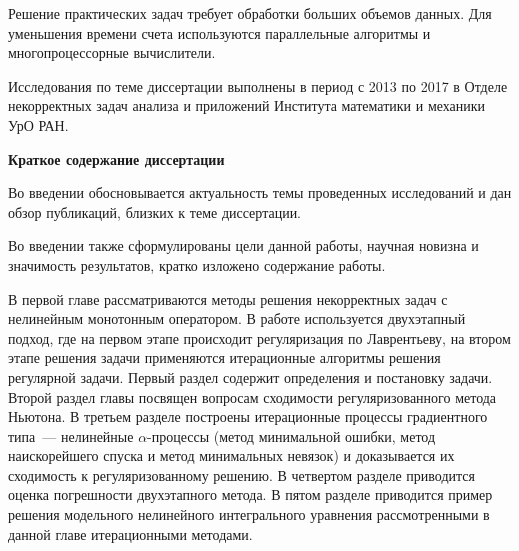 \intro

%
%

\actualitysection
\actualitytext

Решение практических задач требует обработки больших объемов данных. Для уменьшения времени счета используются параллельные алгоритмы и многопроцессорные вычислители.


\developmentsection
\developmenttext

\objectivesection
\objectivetext

\methodssection
\methodstext

\noveltysection
\noveltytext

{}


\approbationsection
\approbationtext

\pubsection
\pubtext

\contribsection
\contribtext

\structsection
\structtext


Исследования по теме диссертации выполнены в период с 2013 по 2017 в Отделе некорректных задач анализа и приложений Института математики и механики УрО РАН.

\textbf{Краткое содержание диссертации}

Во введении обосновывается актуальность темы проведенных исследований и дан обзор публикаций, близких к теме диссертации.

Во введении также сформулированы цели данной работы, научная новизна и значимость результатов, кратко изложено содержание работы.

В первой главе рассматриваются методы решения некорректных задач с нелинейным монотонным оператором. В работе используется двухэтапный подход, где на первом этапе происходит регуляризация по Лаврентьеву, на втором этапе решения задачи применяются итерационные алгоритмы решения регулярной задачи. Первый раздел содержит определения и постановку задачи. Второй раздел главы посвящен вопросам сходимости регуляризованного метода Ньютона. В третьем разделе построены итерационные процессы градиентного типа~--- нелинейные $\alpha$-процессы (метод минимальной ошибки, метод наискорейшего спуска и метод минимальных невязок) и доказывается их сходимость к регуляризованному решению. В четвертом разделе приводится оценка погрешности двухэтапного метода. В пятом разделе приводится пример решения модельного нелинейного интегрального уравнения рассмотренными в данной главе итерационными методами.

